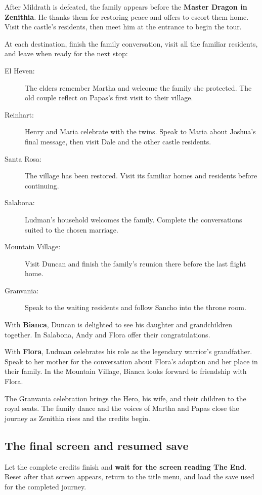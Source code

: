 After Mildrath is defeated, the family appears before
the \textbf{Master Dragon in Zenithia}. He thanks
them for restoring peace and offers to escort them home.
Visit the castle's residents, then meet him at the
entrance to begin the tour.

At each destination, finish the family conversation,
visit all the familiar residents, and leave when ready
for the next stop:
\begin{description}
  \item[El Heven:] The elders remember Martha and welcome
    the family she protected. The old couple reflect on
    Papas's first visit to their village.
  \item[Reinhart:] Henry and Maria celebrate with the twins.
    Speak to Maria about Joshua's final message, then visit
    Dale and the other castle residents.
  \item[Santa Rosa:] The village has been restored. Visit
    its familiar homes and residents before continuing.
  \item[Salabona:] Ludman's household welcomes the family.
    Complete the conversations suited to the chosen marriage.
  \item[Mountain Village:] Visit Duncan and finish the
    family's reunion there before the last flight home.
  \item[Granvania:] Speak to the waiting residents and
    follow Sancho into the throne room.
\end{description}

With \textbf{Bianca}, Duncan is delighted to see his
daughter and grandchildren together. In Salabona,
Andy and Flora offer their congratulations.

With \textbf{Flora}, Ludman celebrates his role as
the legendary warrior's grandfather. Speak to her
mother for the conversation about Flora's adoption
and her place in their family. In the Mountain Village,
Bianca looks forward to friendship with Flora.

The Granvania celebration brings the Hero, his wife,
and their children to the royal seats. The family
dance and the voices of Martha and Papas close the
journey as Zenithia rises and the credits begin.

\subsection*{The final screen and resumed save}

Let the complete credits finish and \textbf{wait for
the screen reading The End}. Reset after that screen
appears, return to the title menu, and load the save
used for the completed journey.

